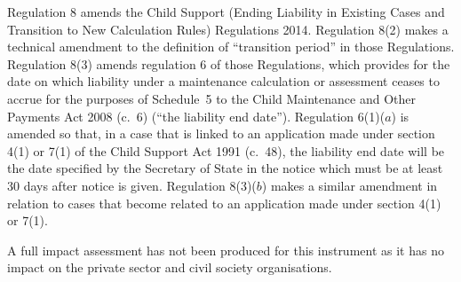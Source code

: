 \documentclass[12pt,a4paper]{article}
\begin{document}
Regulation 8 amends the Child Support (Ending Liability in Existing Cases and Transition to New Calculation Rules) Regulations 2014. Regulation 8(2) makes a technical amendment to the definition of “transition period” in those Regulations. Regulation 8(3) amends regulation 6 of those Regulations, which provides for the date on which liability under a maintenance calculation or assessment ceases to accrue for the purposes of Schedule~5 to the Child Maintenance and Other Payments Act 2008 (c.~6) (“the liability end date”). Regulation 6(1)($a$)  is amended so that, in a case that is linked to an application made under section 4(1) or 7(1) of the Child Support Act 1991 (c.~48), the liability end date will be the date specified by the Secretary of State in the notice which must be at least 30 days after notice is given. Regulation 8(3)($b$)  makes a similar amendment in relation to cases that become related to an application made under section 4(1) or 7(1).

A full impact assessment has not been produced for this instrument as it has no impact on the private sector and civil society organisations. 
\end{document}
